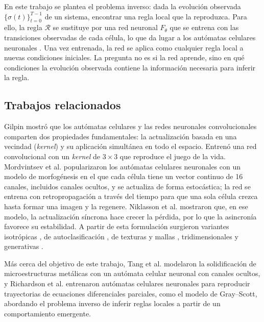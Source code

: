 En este trabajo se plantea el problema inverso: dada la evolución observada $\{\sigma(t)\}_{t=0}^{T-1}$ de un sistema, encontrar una regla local que la reproduzca. Para ello, la regla $\mathcal{R}$ se sustituye por una red neuronal $F_\theta$ que se entrena con las transiciones observadas de cada célula, lo que da lugar a los autómatas celulares neuronales \cite{gilpin2019_nca, mordvintsev2020_nca}. Una vez entrenada, la red se aplica como cualquier regla local a nuevas condiciones iniciales. La pregunta no es si la red aprende, sino en qué condiciones la evolución observada contiene la información necesaria para inferir la regla.

\subsection{Trabajos relacionados}

Gilpin \cite{gilpin2019_nca} mostró que los autómatas celulares y las redes neuronales convolucionales comparten dos propiedades fundamentales: la actualización basada en una vecindad (\textit{kernel}) y su aplicación simultánea en todo el espacio. Entrenó una red convolucional con un \textit{kernel} de $3 \times 3$ que reproduce el juego de la vida. Mordvintsev et al. \cite{mordvintsev2020_nca} popularizaron los autómatas celulares neuronales con un modelo de morfogénesis en el que cada célula tiene un vector continuo de 16 canales, incluidos canales ocultos, y se actualiza de forma estocástica; la red se entrena con retropropagación a través del tiempo para que una sola célula crezca hasta formar una imagen y la regenere. Niklasson et al. \cite{niklasson2021_nca} mostraron que, en ese modelo, la actualización síncrona hace crecer la pérdida, por lo que la asincronía favorece su estabilidad. A partir de esta formulación surgieron variantes isotrópicas \cite{mordvintsev2022_iso_nca}, de autoclasificación \cite{mordvintsev2020_mnist}, de texturas \cite{mordvintsev2021_mnca} y mallas \cite{mordvintsev2024_mesh_nca}, tridimensionales \cite{sudhakaran2021_nca_3d} y generativas \cite{rasmus2022_vnca}.

Más cerca del objetivo de este trabajo, Tang et al. \cite{Jian2023_nca} modelaron la solidificación de microestructuras metálicas con un autómata celular neuronal con canales ocultos, y Richardson et al. \cite{richardson2024_nca} entrenaron autómatas celulares neuronales para reproducir trayectorias de ecuaciones diferenciales parciales, como el modelo de Gray–Scott, abordando el problema inverso de inferir reglas locales a partir de un comportamiento emergente.

